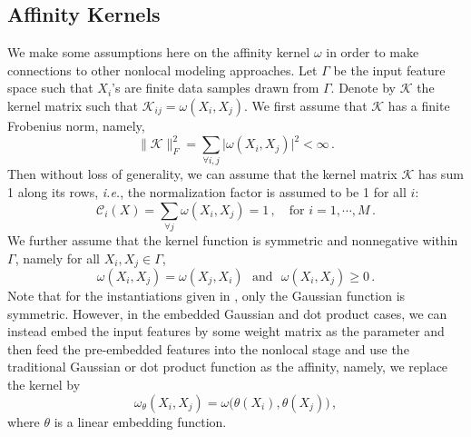 \documentclass{article}
\begin{document}
\subsection{Affinity Kernels}
We make some assumptions here on the affinity kernel $\omega$ in order to make connections to other nonlocal modeling approaches. Let $\Gamma$ be the input feature space such that $X_i$'s are finite data samples drawn from $\Gamma$. Denote by $\mathcal{K}$ the kernel matrix such that $\mathcal{K}_{ij}=\omega(X_i, X_j)$. We first assume that $\mathcal{K}$ has a finite Frobenius norm, namely,
\begin{equation}
\|\mathcal{K}\|_F^2 = \sum_{\forall i,j} \big|\omega(X_i,X_j)\big|^2 < \infty\,.
\end{equation}
Then without loss of generality, we can assume that the kernel matrix $\mathcal{K}$ has sum 1 along its rows, {\em i.e.}, the normalization factor is assumed to be 1 for all $i$:
\begin{equation}
\mathcal{C}_i(X)=\sum_{\forall j}\omega(X_i,X_j)=1\,,\quad\text{for }i=1,\cdots,M\,.
\end{equation}
We further assume that the kernel function is symmetric and nonnegative within $\Gamma$, namely for all $X_i,X_j\in\Gamma$,
\begin{equation}\label{kernel-cond}
\omega(X_i,X_j)=\omega(X_j,X_i)\ \ \ \text{and}\ \ \  \omega(X_i,X_j)\ge 0\,.
\end{equation}
Note that for the instantiations given in \cite{wang2017non}, only the Gaussian function is symmetric. However, in the embedded Gaussian and dot product cases, we can instead embed the input features by some weight matrix as the parameter and then feed the pre-embedded features into the nonlocal stage and use the traditional Gaussian or dot product function as the affinity, namely, we replace the kernel by
\begin{equation}
\omega_\theta(X_i,X_j)=\omega\big(\theta(X_i),\theta(X_j)\big)\,,
\end{equation}
where $\theta$ is a linear embedding function. 
\end{document}
